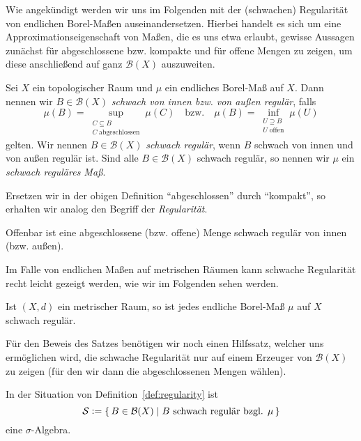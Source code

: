 \documentclass[../main/main.tex]{subfiles}
\begin{document}
	Wie angekündigt werden wir uns im Folgenden mit der (schwachen) Regularität von endlichen Borel-Maßen auseinandersetzen. 
	Hierbei handelt es sich um eine Approximationseigenschaft von Maßen, die es uns etwa erlaubt, gewisse Aussagen 
	zunächst für abgeschlossene bzw. kompakte und für offene Mengen zu zeigen, um diese 
	anschließend auf ganz $\mathcal{B}(X)$ auszuweiten. 
	
	\begin{Definition}
		\label{def:regularity}
		Sei $X$ ein topologischer Raum und $\mu$ ein endliches Borel-Maß auf $X$. 
		Dann nennen wir $B \in \mathcal{B}(X)$ \emph{schwach von 
			innen bzw. von außen regulär}, falls
		$$\mu(B) = \sup_{\substack{C \subseteq B \\ C \; \text{abgeschlossen}}} \mu(C) 
		\quad \text{bzw.} \quad \mu(B) = \inf_{\substack{U \supseteq B \\ U \; \text{offen}}} 
		\mu(U)$$
		gelten. Wir nennen $B \in \mathcal{B}(X)$ \emph{schwach regulär}, wenn $B$ schwach von innen und 
		von außen regulär ist. Sind alle $B \in \mathcal{B}(X)$ schwach regulär, 
		so nennen wir $\mu$ ein \emph{schwach reguläres Maß}.
	\end{Definition}
	
	\begin{Bemerkung}
		Ersetzen wir in der obigen Definition \enquote{abgeschlossen} durch \enquote{kompakt}, 
		so erhalten wir analog den Begriff der \emph{Regularität}. 
		
		Offenbar ist eine abgeschlossene (bzw. offene) Menge schwach regulär von innen (bzw. außen).
	\end{Bemerkung}
	
	Im Falle von endlichen Maßen auf metrischen Räumen kann schwache Regularität 
	recht leicht gezeigt werden, wie wir im Folgenden sehen werden.
	
	\begin{Satz}
		\label{thm:weakregularity}
		Ist $(X, d)$ ein metrischer Raum, so ist jedes endliche Borel-Maß $\mu$ auf $X$ schwach regulär.
	\end{Satz}
	
	Für den Beweis des Satzes benötigen wir noch einen Hilfssatz, welcher 
	uns ermöglichen wird, die schwache Regularität nur auf einem Erzeuger von $\mathcal{B}(X)$ 
	zu zeigen (für den wir dann die abgeschlossenen Mengen wählen).
	
	\begin{Hilfssatz}
		\label{lem:sigmaalg}
		In der Situation von Definition~\ref{def:regularity} ist
		$$\mathcal{S} \vcentcolon = \left\{\, B \in \mathcal{B}(X) \; \middle| \; B \text{ schwach regulär bzgl. } \mu \,\right\}$$
		eine $\sigma$-Algebra.
	\end{Hilfssatz}
	
\end{document}
